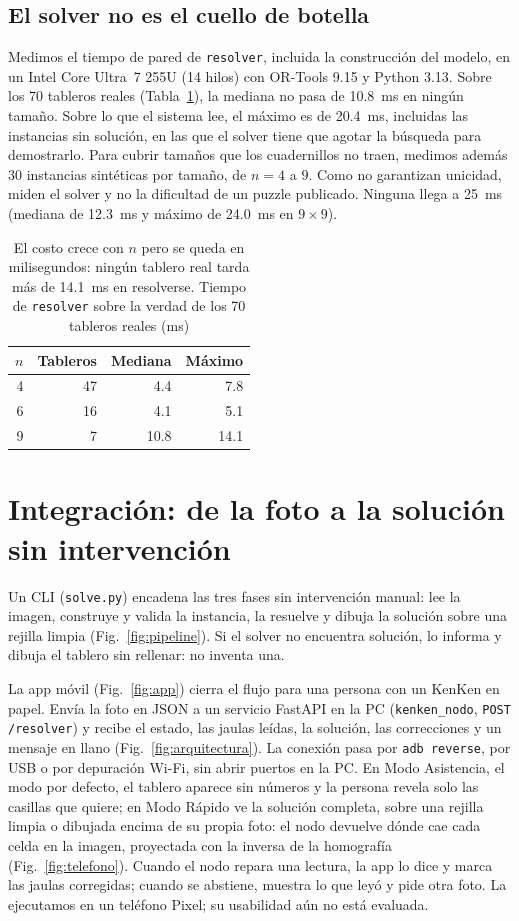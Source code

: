 \documentclass[conference]{IEEEtran}
\begin{document}
\subsection{El solver no es el cuello de botella}\label{sec:tiempos}
Medimos el tiempo de pared de \texttt{resolver}, incluida la construcción del modelo, en un Intel Core Ultra~7 255U (14 hilos) con OR-Tools 9.15 y Python 3.13. Sobre los 70 tableros reales (Tabla~\ref{tab:tiempos}), la mediana no pasa de 10.8~ms en ningún tamaño. Sobre lo que el sistema lee, el máximo es de 20.4~ms, incluidas las instancias sin solución, en las que el solver tiene que agotar la búsqueda para demostrarlo. Para cubrir tamaños que los cuadernillos no traen, medimos además 30 instancias sintéticas por tamaño, de $n = 4$ a $9$. Como no garantizan unicidad, miden el solver y no la dificultad de un puzzle publicado. Ninguna llega a 25~ms (mediana de 12.3~ms y máximo de 24.0~ms en $9 \times 9$).

\begin{table}[t]
\caption{El costo crece con $n$ pero se queda en milisegundos: ningún tablero real tarda más de 14.1~ms en resolverse. Tiempo de \texttt{resolver} sobre la verdad de los 70 tableros reales (ms)}
\label{tab:tiempos}
\centering
\begin{tabular}{rrrr}
\toprule
$n$ & Tableros & Mediana & Máximo \\
\midrule
4 & 47 & 4.4 & 7.8 \\
6 & 16 & 4.1 & 5.1 \\
9 & 7 & 10.8 & 14.1 \\
\bottomrule
\end{tabular}
\end{table}

\section{Integración: de la foto a la solución sin intervención}\label{sec:integracion}
Un CLI (\texttt{solve.py}) encadena las tres fases sin intervención manual: lee la imagen, construye y valida la instancia, la resuelve y dibuja la solución sobre una rejilla limpia (Fig.~\ref{fig:pipeline}). Si el solver no encuentra solución, lo informa y dibuja el tablero sin rellenar: no inventa una.

La app móvil (Fig.~\ref{fig:app}) cierra el flujo para una persona con un KenKen en papel. Envía la foto en JSON a un servicio FastAPI en la PC (\texttt{kenken\_nodo}, \texttt{POST /resolver}) y recibe el estado, las jaulas leídas, la solución, las correcciones y un mensaje en llano (Fig.~\ref{fig:arquitectura}). La conexión pasa por \texttt{adb reverse}, por USB o por depuración Wi-Fi, sin abrir puertos en la PC. En Modo Asistencia, el modo por defecto, el tablero aparece sin números y la persona revela solo las casillas que quiere; en Modo Rápido ve la solución completa, sobre una rejilla limpia o dibujada encima de su propia foto: el nodo devuelve dónde cae cada celda en la imagen, proyectada con la inversa de la homografía (Fig.~\ref{fig:telefono}). Cuando el nodo repara una lectura, la app lo dice y marca las jaulas corregidas; cuando se abstiene, muestra lo que leyó y pide otra foto. La ejecutamos en un teléfono Pixel; su usabilidad aún no está evaluada.
\end{document}
